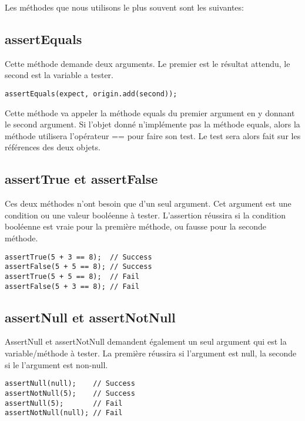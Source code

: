 \documentclass[12pt]{article}		%
\begin{document}
Les méthodes que nous utilisons le plus souvent sont les suivantes:

\subsection{assertEquals}

Cette méthode demande deux arguments. Le premier est le résultat attendu, le second est la variable a tester.

\lstset{language=Java, numbers=left}
\begin{lstlisting}[basicstyle=\small]
assertEquals(expect, origin.add(second));
\end{lstlisting}

Cette méthode va appeler la méthode equals du premier argument en y donnant le second argument. Si l'objet donné n'implémente pas la méthode equals, alors la méthode utilisera l'opérateur == pour faire son test. Le test sera alors fait sur les références des deux objets.

\subsection{assertTrue et assertFalse}

Ces deux méthodes n'ont besoin que d'un seul argument. Cet argument est une condition ou une valeur booléenne à tester. L'assertion réussira si la condition booléenne est vraie pour la première méthode, ou fausse  pour la seconde méthode.

\lstset{language=Java, numbers=left}
\begin{lstlisting}[basicstyle=\small]
assertTrue(5 + 3 == 8);  // Success
assertFalse(5 + 5 == 8); // Success
assertTrue(5 + 5 == 8);  // Fail
assertFalse(5 + 3 == 8); // Fail
\end{lstlisting}

\subsection{assertNull et assertNotNull}

AssertNull et assertNotNull demandent également un seul argument qui est la variable/méthode à tester. La première réussira si l'argument est null, la seconde si le l'argument est non-null.

\lstset{language=Java, numbers=left}
\begin{lstlisting}[basicstyle=\small]
assertNull(null);    // Success
assertNotNull(5);    // Success
assertNull(5);       // Fail
assertNotNull(null); // Fail
\end{lstlisting}
\end{document}
